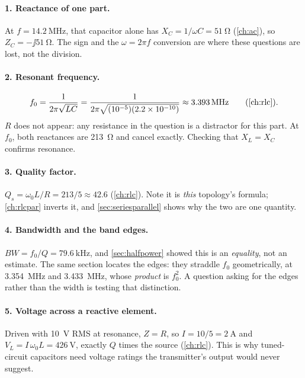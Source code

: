\paragraph{1. Reactance of one part.}
At \(f=\SI{14.2}{\mega\hertz}\), that capacitor alone has
\(X_C=1/\omega C=\SI{51}{\ohm}\) (\cref{ch:ac}), so \(Z_C=-\jj\SI{51}{\ohm}\). The
sign and the \(\omega=2\pi f\) conversion are where these questions are lost, not the
division.

\paragraph{2. Resonant frequency.}
\[
f_0=\frac{1}{2\pi\sqrt{LC}}
=\frac{1}{2\pi\sqrt{(10^{-5})(2.2\times10^{-10})}}
\approx\SI{3.393}{\mega\hertz}
\qquad(\cref{ch:rlc}).
\]
\(R\) does not appear: any resistance in the question is a distractor for this part.
At \(f_0\), both reactances are \SI{213}{\ohm} and cancel exactly. Checking that
\(X_L=X_C\) confirms resonance.

\paragraph{3. Quality factor.}
\(Q_s=\omega_0L/R=213/5\approx42.6\) (\cref{ch:rlc}). Note it is
\emph{this} topology's formula; \cref{ch:rlcpar} inverts it, and
\cref{sec:seriesparallel} shows why the two are one quantity.

\paragraph{4. Bandwidth and the band edges.}
\(BW=f_0/Q=\SI{79.6}{\kilo\hertz}\), and \cref{sec:halfpower} showed this is an
\emph{equality}, not an estimate. The same section locates the edges: they straddle
\(f_0\) geometrically, at \SI{3.354}{\mega\hertz} and \SI{3.433}{\mega\hertz}, whose
\emph{product} is \(f_0^2\). A question asking for the edges rather than the width is
testing that distinction.

\paragraph{5. Voltage across a reactive element.}
Driven with \SI{10}{\volt} RMS at resonance, \(Z=R\), so \(I=10/5=\SI{2}{\ampere}\)
and
\(V_L=I\,\omega_0L=\SI{426}{\volt}\), exactly \(Q\) times the source
(\cref{ch:rlc}). This is why tuned-circuit capacitors need voltage ratings the
transmitter's output would never suggest.

